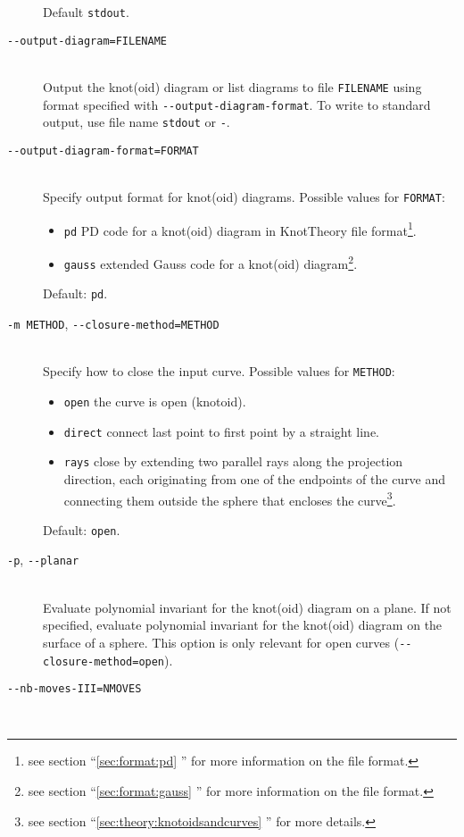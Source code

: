 \begin{description}
  Default \lstinline{stdout}.
\item[\lstinline{--output-diagram=FILENAME}]\hfill\\
  Output the knot(oid) diagram or list diagrams to  file \lstinline{FILENAME} using format specified with \lstinline{--output-diagram-format}. To write to standard output, use file name \lstinline{stdout} or \lstinline{-}.
\item[\lstinline{--output-diagram-format=FORMAT}]\hfill\\
  Specify output format for knot(oid) diagrams. Possible values for \lstinline{FORMAT}:
  \begin{itemize}
    \item \lstinline{pd} PD code for a knot(oid) diagram in KnotTheory file format\footnote{see section ``\ref{sec:format:pd} ''  for more information on the file format.}.  
    \item \lstinline{gauss} extended Gauss code for a knot(oid) diagram\footnote{see section ``\ref{sec:format:gauss} ''  for more information on the file format.}.
  \end{itemize}
  Default: \lstinline{pd}.
\item[\lstinline{-m METHOD}, \lstinline{--closure-method=METHOD}]\hfill\\
  Specify how to close the input curve. Possible values for \lstinline{METHOD}:
  \begin{itemize}
  \item \lstinline{open} the curve is open (knotoid).
  \item \lstinline{direct} connect last point to first point by a straight line.
  \item \lstinline{rays} close by extending two parallel rays along the projection direction, each originating from one of the endpoints of the curve and connecting them outside the sphere that encloses the curve\footnote{see section ``\ref{sec:theory:knotoidsandcurves} '' for more details.}.
  \end{itemize}
  Default: \lstinline{open}.
\item[\lstinline{-p}, \lstinline{--planar}]\hfill\\
  Evaluate polynomial invariant for the knot(oid) diagram on a plane. If not specified, evaluate polynomial invariant for the knot(oid) diagram on the surface of a sphere. This option is only relevant for open curves (\lstinline{--closure-method=open}).
\item[\lstinline{--nb-moves-III=NMOVES}]\hfill\\

\end{description}
